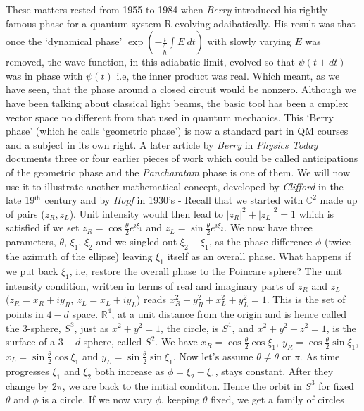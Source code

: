 These matters rested from 1955 to 1984 when \textit{Berry} introduced his rightly
famous phase for a quantum system R evolving adaibatically. His result was that
once the `dynamical phase' $\exp(-  \frac{i}{\not{h}} \int E ~dt)$  with slowly varying $E$ was removed,
the wave function, in this adiabatic limit, evolved so that $\psi(t + dt)$ was in phase
with $\psi(t)$ i.e, the inner product was real. Which meant, as we have seen, that
the phase around a closed circuit would be nonzero. Although we have been
talking about classical light beams, the basic tool has been a cmplex vector
space no different from that used in quantum mechanics. This `Berry phase'
(which he calls `geometric phase') is now a standard part in QM courses and a
subject in its own right. A later article by \textit{Berry} in \textit{Physics Today} documents
three or four earlier pieces of work which could be called anticipations of the
geometric phase and the \textit{Pancharatam} phase is one of them. We will now use
it to illustrate another mathematical concept, developed by \textit{Clifford} in the late
19$^{\rm th}$ century and by \textit{Hopf} in 1930's - Recall that we started with $\mathbb{C}^2$ made up
of pairs ($z_R, z_L$). Unit intensity would then lead to $| z_R |^2 + | z_L |^2 = 1$ which
is satisfied if we set $z_R = \cos \frac{\theta}{2} e^{i \xi_1}$ and $z_L = \sin \frac{\theta}{2} e^{i \xi_2}$. We now have three
parameters, $\theta$, $\xi_1$, $\xi_2$ and we singled out $\xi_2 - \xi_1$, as the phase difference $\phi$ (twice
the azimuth of the ellipse) leaving $\xi_1$ itself as an overall phase. What happens if
we put back $\xi_1$, i.e, restore the overall phase to the Poincare sphere? The unit
intensity condition, written in terms of real and imaginary parts of $z_R$ and $z_L$
$(z_R = x_R + iy_R, ~z_L = x_L + iy_L$) reads $x^2_R + y^2_R + x^2_L + y^2_L = 1$. This is the set of
points in $4-d$ space. $\mathbb{R}^4$, at a unit distance from the origin and is hence called the
3-sphere, $S^3$, just as $x^2 + y^2 = 1$, the circle, is $S^1$, and $x^2 + y^2 + z^2 = 1$, is the
surface of a $3-d$ sphere, called $S^2$. We have $x_R = \cos \frac{\theta}{2} \cos \xi_1, ~y_R = \cos \frac{\theta}{2} \sin \xi_1$, 
$x_L = \sin \frac{\theta}{2} \cos \xi_1$ and $y_L = \sin \frac{\theta}{2} \sin \xi_1$. Now let's assume $\theta \neq \theta$ or $\pi$. As time
progresses $\xi_1$ and $\xi_2$ both increase as $\phi = \xi_2 - \xi_1$, stays constant. After they
change by $2\pi$, we are back to the initial conditon. Hence the orbit in $S^3$ for fixed
$\theta$ and $\phi$ is a circle. If we now vary $\phi$, keeping $\theta$ fixed, we get a family of circles
